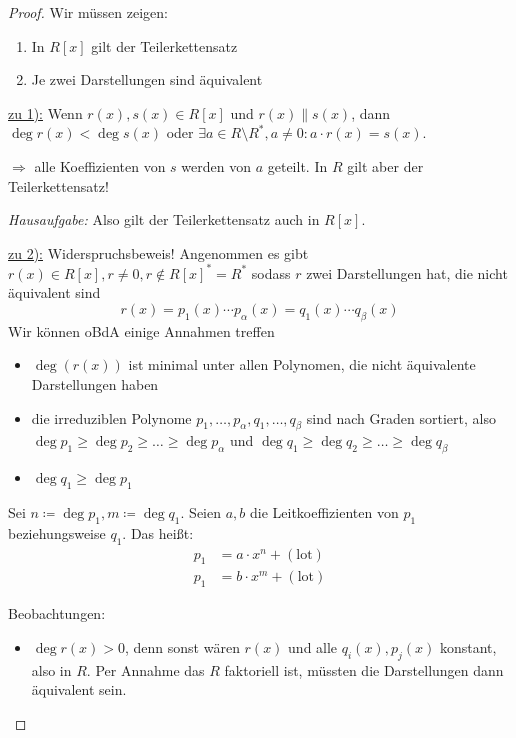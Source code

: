\documentclass[a4paper,12pt,numbers=noenddot,parskip=full]{scrartcl}
\newcommand{\heading}{\underline}
\theoremstyle{dotless}
\theoremstyle{remark}
\begin{document}
	\begin{proof}
		Wir müssen zeigen:
		\begin{enumerate}
			\item In $R[x]$ gilt der Teilerkettensatz
			\item Je zwei Darstellungen sind äquivalent
		\end{enumerate}
	
		\heading{zu 1):} Wenn $r(x),s(x) \in R[x]$ und $r(x) \parallel s(x)$, dann $\deg r(x) < \deg s(x)$ oder $\exists a \in R \setminus R^*, a \neq 0: a \cdot r(x) = s(x)$.
		
		$\Rightarrow$ alle Koeffizienten von $s$ werden von $a$ geteilt. In $R$ gilt aber der Teilerkettensatz!
		
		\textit{Hausaufgabe:} Also gilt der Teilerkettensatz auch in $R[x]$.
		
		\heading{zu 2):} Widerspruchsbeweis! Angenommen es gibt $r(x) \in R[x], r \neq 0, r \notin R[x]^* = R^*$ sodass $r$ zwei Darstellungen hat, die nicht äquivalent sind
		\begin{equation*}
			\tag{$*$}
			r(x) = p_1(x) \cdots p_\alpha(x) = q_1(x) \cdots q_\beta(x)
		\end{equation*}
		Wir können oBdA einige Annahmen treffen
		\begin{itemize}
			\item $\deg (r(x))$ ist minimal unter allen Polynomen, die nicht äquivalente Darstellungen haben
			\item die irreduziblen Polynome $p_1, \dots, p_\alpha, q_1, \dots, q_\beta$ sind nach Graden sortiert, also $\deg p_1 \geq \deg p_2 \geq \dots \geq \deg p_\alpha$ und $\deg q_1 \geq \deg q_2 \geq \dots \geq \deg q_\beta$
			\item $\deg q_1 \geq \deg p_1$
		\end{itemize}
	
		Sei $n \coloneqq \deg p_1, m \coloneqq \deg q_1$. Seien $a,b$ die Leitkoeffizienten von $p_1$ beziehungsweise $q_1$. Das heißt:
		\begin{align*}
			p_1 &= a \cdot x^n + (\text{lot}) \\
			p_1 &= b \cdot x^m + (\text{lot})
		\end{align*}
		
		Beobachtungen:
		\begin{itemize}
			\item $\deg r(x) > 0$, denn sonst wären $r(x)$ und alle $q_i(x), p_j(x)$ konstant, also in $R$. Per Annahme das $R$ faktoriell ist, müssten die Darstellungen dann äquivalent sein.
			

\end{itemize}
\end{proof}
\end{document}
